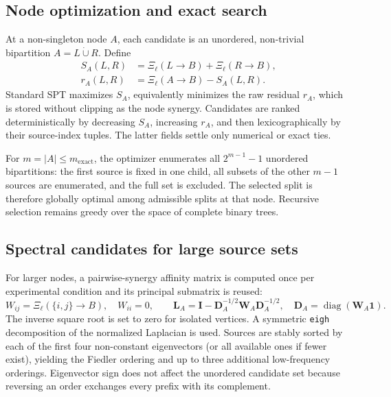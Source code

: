 \documentclass[fleqn,10pt]{wlscirep}
\begin{document}
\subsection{Node optimization and exact search}

At a non-singleton node \(A\), each candidate is an unordered, non-trivial bipartition \(A=L\mathbin{\dot{\cup}}R\). Define 
\begin{align} S_A(L,R)&=\Xi_{\ell}(L\rightarrow B)+\Xi_{\ell}(R\rightarrow B),\\ r_A(L,R)&=\Xi_{\ell}(A\rightarrow B)-S_A(L,R). 
\label{eq:supp_spt_score} 
\end{align} 
Standard SPT maximizes \(S_A\), equivalently minimizes the raw residual \(r_A\), which is stored without clipping as the node synergy. Candidates are ranked deterministically by decreasing \(S_A\), increasing \(r_A\), and then lexicographically by their source-index tuples. The latter fields settle only numerical or exact ties.

For \(m=|A|\leq m_{\mathrm{exact}}\), the optimizer enumerates all \(2^{m-1}-1\) unordered bipartitions: the first source is fixed in one child, all subsets of the other \(m-1\) sources are enumerated, and the full set is excluded. The selected split is therefore globally optimal among admissible splits at that node. Recursive selection remains greedy over the space of complete binary trees.\par 


\subsection{Spectral candidates for large source sets}
For larger nodes, a pairwise-synergy affinity matrix is computed once per experimental condition and its principal submatrix is reused: 
\begin{equation} W_{ij}=\Xi_{\ell}(\{i,j\}\rightarrow B),\quad W_{ii}=0,\qquad \mathbf{L}_A=\mathbf{I}-\mathbf{D}_A^{-1/2} \mathbf{W}_A\mathbf{D}_A^{-1/2},\quad \mathbf{D}_A=\operatorname{diag}(\mathbf{W}_A\mathbf{1}). 
\label{eq:supp_spt_spectral} 
\end{equation} 
The inverse square root is set to zero for isolated vertices. A symmetric \texttt{eigh} decomposition of the normalized Laplacian is used. Sources are stably sorted by each of the first four non-constant eigenvectors (or all available ones if fewer exist), yielding the Fiedler ordering and up to three additional low-frequency orderings. Eigenvector sign does not affect the unordered candidate set because reversing an order exchanges every prefix with its complement.
\end{document}

